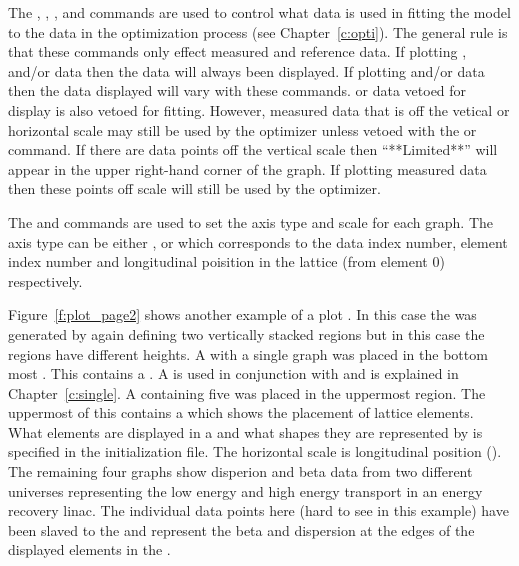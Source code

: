 The , , , and  commands are used
to control what data is used in fitting the model to the data in the
optimization process (see Chapter~\ref{c:opti}). The general rule is
that these commands only effect measured and reference data. If
plotting ,  and/or  data then the data
will always been displayed. If plotting  and/or  data
then the data displayed will vary with these commands.   or
 data vetoed for display is also vetoed for fitting.  However,
measured data that is off the vetical or horizontal scale may still be
used by the optimizer unless vetoed with the  or 
command.  If there are data points off the vertical scale then
``**Limited**'' will appear in the upper right-hand corner of the
graph. If plotting measured data then these points off scale will
still be used by the optimizer.

The  and  commands are used to set the axis
type and scale for each graph. The axis type can be either ,
 or  which corresponds to the data index number,
element index number and longitudinal poisition in the lattice (from
element 0) respectively.

Figure~\ref{f:plot_page2} shows another example of a plot .
In this case the  was generated by again defining two
vertically stacked regions but in this case the regions have different
heights.  A  with a single graph was placed in the
bottom most .  This  contains a .
A  is used in conjunction with  and is
explained in Chapter~\ref{c:single}. A  containing
five  was placed in the uppermost region. The uppermost
 of this  contains a  which
shows the placement of lattice elements.  What elements are displayed
in a  and what shapes they are represented by is
specified in the initialization file. The horizontal scale is
longitudinal position ().  The remaining four graphs show
disperion and beta data from two different universes representing the
low energy and high energy transport in an energy recovery linac. The
individual data points here (hard to see in this example) have been
slaved to the  and represent the beta and dispersion at
the edges of the displayed elements in the .



